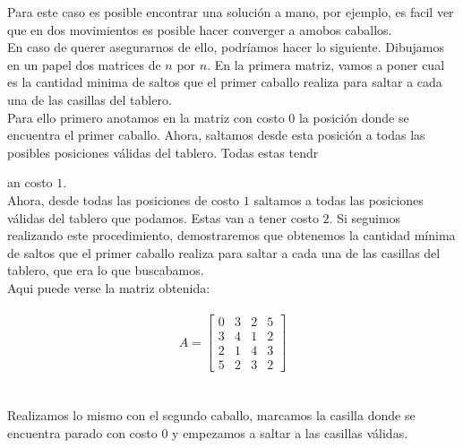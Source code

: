 Para este caso es posible encontrar una soluci\'on a mano, por ejemplo, es facil ver que en dos movimientos es posible hacer converger a amobos caballos.
\\
En caso de querer asegurarnos de ello, podr\'iamos hacer lo siguiente. Dibujamos en un papel dos matrices de $n$ por $n$. En la primera matriz, vamos a poner cual es la cantidad minima de saltos que el primer caballo realiza para saltar a cada una de las casillas del tablero. 
\\
Para ello primero anotamos en la matriz con costo $0$ la posición donde se encuentra el primer caballo. Ahora, saltamos desde esta posición a todas las posibles posiciones válidas del tablero. Todas estas tendr{an costo $1$.
\\
Ahora, desde todas las posiciones de costo $1$ saltamos a todas las posiciones válidas del tablero que podamos. Estas van a tener costo $2$. Si seguimos realizando este procedimiento, demostraremos que obtenemos la cantidad mínima de saltos que el primer caballo realiza para saltar a cada una de las casillas del tablero, que era lo que buscabamos.
\\
Aqui puede verse la matriz obtenida:
\\
\\
$$A = \begin{bmatrix}
      0 & 3 & 2 & 5   \\[0.3em]
      3 & 4 & 1 & 2   \\[0.3em]
      2 & 1 & 4 & 3   \\[0.3em]
      5 & 2 & 3 & 2 
\end{bmatrix}$$
\\
\\
Realizamos lo mismo con el segundo caballo, marcamos la casilla donde se encuentra parado con costo $0$ y empezamos a saltar a las casillas válidas.

}
